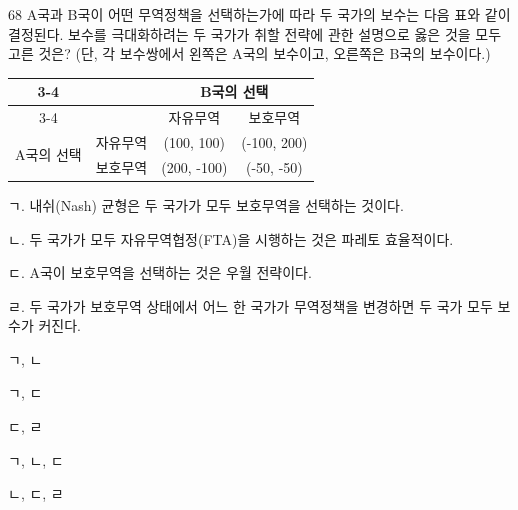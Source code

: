 \begin{question}{68}
A국과 B국이 어떤 무역정책을 선택하는가에 따라 두 국가의 보수는 다음 표와 같이 결정된다. 보수를 극대화하려는 두 국가가 취할 전략에 관한 설명으로 옳은 것을 모두 고른 것은? (단, 각 보수쌍에서 왼쪽은 A국의 보수이고, 오른쪽은 B국의 보수이다.)

{\small\centering
\begin{tabular}{cc|c|c|}
\cline{3-4}
 & & \multicolumn{2}{c|}{B국의 선택} \\
\cline{3-4}
 & & 자유무역 & 보호무역 \\
\hline
\multicolumn{1}{|c|}{\multirow{2}{*}{A국의 선택}} & 자유무역 & (100, 100) & (-100, 200) \\
\cline{2-4}
\multicolumn{1}{|c|}{} & 보호무역 & (200, -100) & (-50, -50) \\
\hline
\end{tabular}\par}

\begin{framedtext}
ㄱ. 내쉬(Nash) 균형은 두 국가가 모두 보호무역을 선택하는 것이다. \par
ㄴ. 두 국가가 모두 자유무역협정(FTA)을 시행하는 것은 파레토 효율적이다. \par
ㄷ. A국이 보호무역을 선택하는 것은 우월 전략이다. \par
ㄹ. 두 국가가 보호무역 상태에서 어느 한 국가가 무역정책을 변경하면 두 국가 모두 보수가 커진다.
\end{framedtext}
\begin{choices}
  \item ㄱ, ㄴ
  \item ㄱ, ㄷ
  \item ㄷ, ㄹ
  \item ㄱ, ㄴ, ㄷ
  \item ㄴ, ㄷ, ㄹ
\end{choices}
\end{question}
